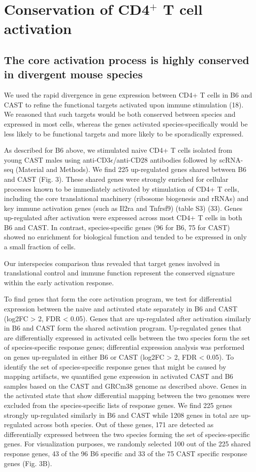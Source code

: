 \section{Conservation of CD4$^+$ T cell activation}
\subsection*{The core activation process is highly conserved in divergent mouse species}

We used the rapid divergence in gene expression between CD4+ T cells in B6 and CAST to refine the functional targets activated upon immune stimulation (18). We reasoned that such targets would be both conserved between species and expressed in most cells, whereas the genes activated species-specifically would be less likely to be functional targets and more likely to be sporadically expressed.

As described for B6 above, we stimulated naive CD4+ T cells isolated from young CAST males using anti-CD3$\epsilon$/anti-CD28 antibodies followed by scRNA-seq (Material and Methods). 
We find 225 up-regulated genes shared between B6 and CAST (Fig. 3). These shared genes were strongly enriched for cellular processes known to be immediately activated by stimulation of CD4+ T cells, including the core translational machinery (ribosome biogenesis and rRNAs) and key immune activation genes (such as Il2ra and Tnfrsf9) (table S3) (33). Genes up-regulated after activation were expressed across most CD4+ T cells in both B6 and CAST. In contrast, species-specific genes (96 for B6, 75 for CAST) showed no enrichment for biological function and tended to be expressed in only a small fraction of cells. 

Our interspecies comparison thus revealed that target genes involved in translational control and immune function represent the conserved signature within the early activation response.

To find genes that form the core activation program, we test for differential expression between the naive and activated state separately in B6 and CAST (log2FC > 2, FDR < 0.05). Genes that are up-regulated after activation similarly in B6 and CAST form the shared activation program. Up-regulated genes that are differentially expressed in activated cells between the two species form the set of species-specific response genes; differential expression analysis was performed on genes up-regulated in either B6 or CAST (log2FC > 2, FDR < 0.05). To identify the set of species-specific response genes that might be caused by mapping artifacts, we quantified gene expression in activated CAST and B6 samples based on the CAST and GRCm38 genome as described above. Genes in the activated state that show differential mapping between the two genomes were excluded from the species-specific lists of response genes. We find 225 genes strongly up-regulated similarly in B6 and CAST while 1208 genes in total are up-regulated across both species. Out of these genes, 171 are detected as differentially expressed between the two species forming the set of species-specific genes. For visualization purposes, we randomly selected 100 out of the 225 shared response genes, 43 of the 96 B6 specific and 33 of the 75 CAST specific response genes (Fig. 3B).

